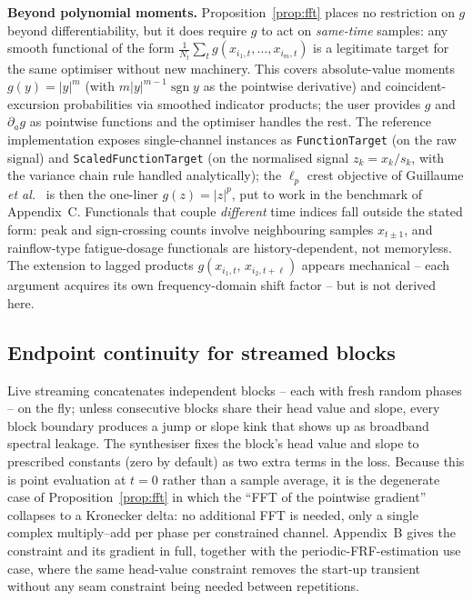 \documentclass[10pt,a4paper]{article}
\numberwithin{equation}{section}
\newcommand{\abs}[1]{\left|#1\right|}
\newcommand{\mat}[1]{\left(#1\right)}
\begin{document}
\textbf{Beyond polynomial moments.} Proposition~\ref{prop:fft} places no restriction on $g$ beyond differentiability, but it does require $g$ to act on \emph{same-time} samples: any smooth functional of the form $\frac{1}{N_t}\sum_t g\mat{x_{i_1,t},\ldots,x_{i_m,t}}$ is a legitimate target for the same optimiser without new machinery. This covers absolute-value moments $g\mat{y}=\abs{y}^m$ (with $m\abs{y}^{m-1}\operatorname{sgn} y$ as the pointwise derivative) and coincident-excursion probabilities via smoothed indicator products; the user provides $g$ and $\partial_a g$ as pointwise functions and the optimiser handles the rest. The reference implementation exposes single-channel instances as \texttt{FunctionTarget} (on the raw signal) and \texttt{ScaledFunctionTarget} (on the normalised signal $z_k = x_k/s_k$, with the variance chain rule handled analytically); the $\ell_p$ crest objective of Guillaume \emph{et al.}~\cite{guillaume1991crest} is then the one-liner $g\mat{z}=\abs{z}^p$, put to work in the benchmark of Appendix~C. Functionals that couple \emph{different} time indices fall outside the stated form: peak and sign-crossing counts involve neighbouring samples $x_{t\pm1}$, and rainflow-type fatigue-dosage functionals are history-dependent, not memoryless. The extension to lagged products $g\mat{x_{i_1,t},\,x_{i_2,t+\ell}}$ appears mechanical -- each argument acquires its own frequency-domain shift factor -- but is not derived here.

\subsection*{Endpoint continuity for streamed blocks}

Live streaming concatenates independent blocks -- each with fresh random phases -- on the fly; unless consecutive blocks share their head value and slope, every block boundary produces a jump or slope kink that shows up as broadband spectral leakage. The synthesiser fixes the block's head value and slope to prescribed constants (zero by default) as two extra terms in the loss. Because this is point evaluation at $t=0$ rather than a sample average, it is the degenerate case of Proposition~\ref{prop:fft} in which the ``FFT of the pointwise gradient'' collapses to a Kronecker delta: no additional FFT is needed, only a single complex multiply--add per phase per constrained channel. Appendix~B gives the constraint and its gradient in full, together with the periodic-FRF-estimation use case, where the same head-value constraint removes the start-up transient without any seam constraint being needed between repetitions.
\end{document}
